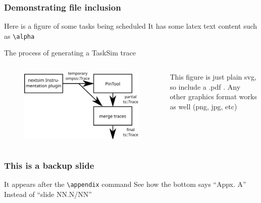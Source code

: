 \documentclass[aspectratio=169,c,12pt]{beamer}
\begin{document}
\begin{frame}[fragile]
	\frametitle{Demonstrating file inclusion}
	\begin{block}{Here is a figure of some tasks being scheduled}
		It has some latex text content such as \verb|\alpha|
		\begin{figure}[h!]
		\centering
		\tiny %
		
		\end{figure}
	\end{block}
	\vspace{-1em}\pause
	\begin{block}{The process of generating a TaskSim trace}
		\begin{columns}
		\begin{column}{0.3\linewidth}
			\begin{figure}[h!]
			\centering
			\includegraphics[width=\linewidth]{tracing_architecture}
			\end{figure}
		\end{column}
		\begin{column}{0.5\linewidth}
			This figure is just plain svg, so include a .pdf . Any other graphics format works as well (png, jpg, etc)
		\end{column}
		\end{columns}
	\end{block}
\end{frame}


\appendix

\begin{frame}
	\frametitle{This is a backup slide}
	\begin{block}{It appears after the \texttt{\textbackslash appendix} command}
		See how the bottom says ``Appx. A'' Instead of ``slide NN.N/NN''
	\end{block}
\end{frame}
\end{document}
